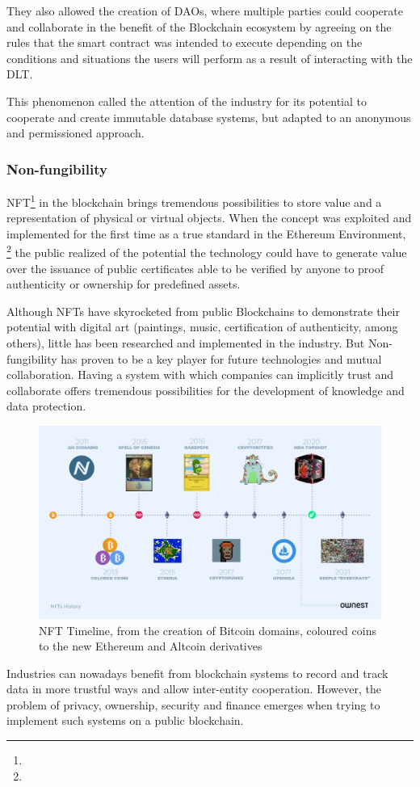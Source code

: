 They also allowed the creation of \ac{DAO}s, where multiple parties could cooperate and collaborate in the benefit of the Blockchain ecosystem by agreeing on the rules that the smart contract was intended to execute depending on the conditions and situations the users will perform as a result of interacting with the \ac{DLT}.

This phenomenon called the attention of the industry for its potential to cooperate and create immutable database systems, but adapted to an anonymous and permissioned approach.

\subsubsection{Non-fungibility}
\ac{NFT}\footnote{} in the blockchain brings tremendous possibilities to store value and a representation of physical or virtual objects. When the concept was exploited and implemented for the first time as a true standard in the Ethereum Environment\cite{EIP721No48:online}, \footnote{} the public realized of the potential the technology could have to generate value over the issuance of public certificates able to be verified by anyone to proof authenticity or ownership for predefined assets. 

Although \ac{NFT}s have skyrocketed from public Blockchains to demonstrate their potential with digital art (paintings, music, certification of authenticity, among others), little has been researched and implemented in the industry. But Non-fungibility has proven to be a key player for future technologies and mutual collaboration. Having a system with which companies can implicitly trust and collaborate offers tremendous possibilities for the development of knowledge and data protection.

\begin{figure}[h]
\includegraphics[width=15cm]{img/01-NFT_Timeline.png}
\centering
\caption{NFT Timeline, from the creation of Bitcoin domains, coloured coins to the new Ethereum and Altcoin derivatives  \cite{OwnestNF21:online}}
\end{figure}

Industries can nowadays benefit from blockchain systems to record and track data in more trustful ways and allow inter-entity cooperation. However, the problem of privacy, ownership, security and finance emerges when trying to implement such systems on a public blockchain. 
